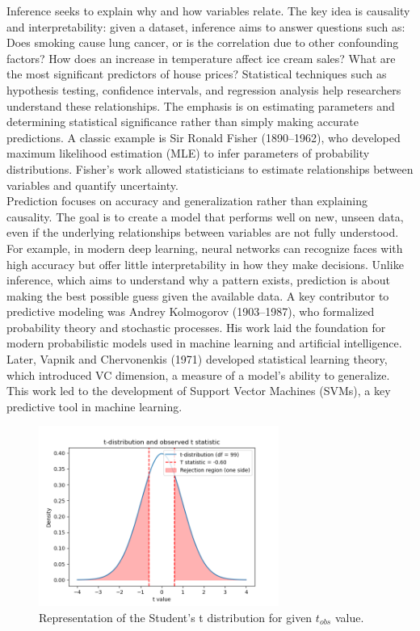 \documentclass{book}
\begin{document}
Inference seeks to explain why and how variables relate. The key idea is causality and interpretability: given a dataset, inference aims to answer questions such as: Does smoking cause lung cancer, or is the correlation due to other confounding factors? How does an increase in temperature affect ice cream sales? What are the most significant predictors of house prices? Statistical techniques such as hypothesis testing, confidence intervals, and regression analysis help researchers understand these relationships. The emphasis is on estimating parameters and determining statistical significance rather than simply making accurate predictions. A classic example is Sir Ronald Fisher (1890–1962), who developed maximum likelihood estimation (MLE) to infer parameters of probability distributions. Fisher’s work allowed statisticians to estimate relationships between variables and quantify uncertainty.\\

Prediction focuses on accuracy and generalization rather than explaining causality. The goal is to create a model that performs well on new, unseen data, even if the underlying relationships between variables are not fully understood. For example, in modern deep learning, neural networks can recognize faces with high accuracy but offer little interpretability in how they make decisions. Unlike inference, which aims to understand why a pattern exists, prediction is about making the best possible guess given the available data. A key contributor to predictive modeling was Andrey Kolmogorov (1903–1987), who formalized probability theory and stochastic processes. His work laid the foundation for modern probabilistic models used in machine learning and artificial intelligence. Later, Vapnik and Chervonenkis (1971) developed statistical learning theory, which introduced VC dimension, a measure of a model’s ability to generalize. This work led to the development of Support Vector Machines (SVMs), a key predictive tool in machine learning.\\

\begin{figure}[ht]
    \centering
    \includegraphics[width=0.7\textwidth]{figures/chapter4/t_1_sample_distribution.png}
    \caption{Representation of the Student's t distribution for given $t_{obs}$ value.}
    \label{fig:t_1_sample_dist}
\end{figure}
\end{document}
